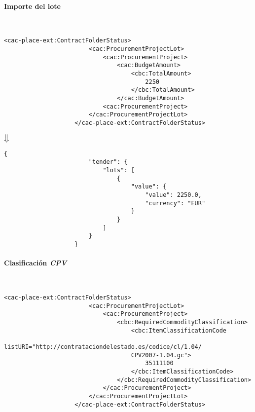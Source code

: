             \paragraph{Importe del lote} \mbox{}\\
                \begin{lstlisting}[language=lXML]
                    <cac-place-ext:ContractFolderStatus>
                        <cac:ProcurementProjectLot>
                            <cac:ProcurementProject>
                                <cac:BudgetAmount>
                                    <cbc:TotalAmount>
                                        2250
                                    </cbc:TotalAmount>
                                </cac:BudgetAmount>
                            <cac:ProcurementProject>
                        </cac:ProcurementProjectLot>
                    </cac-place-ext:ContractFolderStatus>
                \end{lstlisting}
                
                \begin{center}
                    $\big\Downarrow$
                \end{center}
                
                \begin{lstlisting}[language=lJSON]
                    {
                        "tender": {
                            "lots": [
                                {
                                    "value": {
                                        "value": 2250.0,
                                        "currency": "EUR"
                                    }
                                }
                            ]
                        }
                    }
                \end{lstlisting}
                
            \paragraph{Clasificación \textit{CPV}} \mbox{}\\
                \begin{lstlisting}[language=lXML]
                    <cac-place-ext:ContractFolderStatus>
                        <cac:ProcurementProjectLot>
                            <cac:ProcurementProject>
                                <cbc:RequiredCommodityClassification>
                                    <cbc:ItemClassificationCode 
                                    listURI="http://contrataciondelestado.es/codice/cl/1.04/
                                    CPV2007-1.04.gc">
                                        35111100
                                    </cbc:ItemClassificationCode>
                                </cbc:RequiredCommodityClassification>
                            </cac:ProcurementProject>
                        </cac:ProcurementProjectLot>
                    </cac-place-ext:ContractFolderStatus>
                \end{lstlisting}
                
